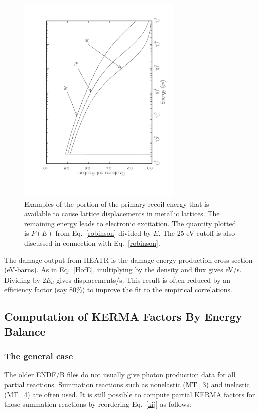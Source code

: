 \begin{figure}[t]\centering
\includegraphics[height=4.0in, angle=270]{figs/heatr2ack}
\caption[Sample recoil energy and lattice displacement data]
  {Examples of the portion of the primary recoil
  energy that is available to cause lattice displacements in
  metallic lattices.  The remaining energy leads to electronic
  excitation.  The quantity plotted is $P(E)$ from
  Eq.~\ref{robinson} divided by $E$.  The 25 eV cutoff
  is also discussed in connection with Eq.~\ref{robinson}.}
\label{f2}
\end{figure}

The damage output from HEATR is the damage energy production
cross section (eV-barns).  As in Eq.~\ref{HofE}, multiplying by
the density and flux gives eV/s.  Dividing by $2E_d$ gives
displacements/s.  This result is often reduced by an efficiency
factor (say 80\%) to improve the fit to the empirical correlations.


\subsection{Computation of KERMA Factors By Energy Balance}
\label{ssHEATR_KERMA}

\subsubsection{The general case}
\label{sssHEATR_generalKERMA}

The older ENDF/B files do not usually give photon production data for
all partial reactions.  Summation reactions such as nonelastic
(MT=3) and inelastic (MT=4) are often used.  It is still possible
to compute partial KERMA factors for those summation reactions by
reordering Eq.~\ref{kij} as follows:

